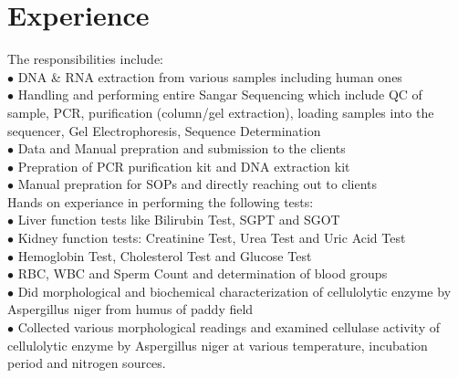 \documentclass[letterpaper]{twentysecondcv} %
\begin{document}

\section{Experience}

\begin{twenty} %
	{The responsibilities include:\\
	$\bullet$ DNA \& RNA extraction from various samples including human ones\\
	$\bullet$ Handling and performing entire Sangar Sequencing which include  QC of sample, PCR, purification (column/gel extraction), loading samples into the sequencer, Gel Electrophoresis, Sequence Determination\\
	$\bullet$ Data and Manual prepration and submission to the clients\\
	$\bullet$ Prepration of PCR purification kit and DNA extraction kit\\
	$\bullet$ Manual prepration for SOPs and directly reaching out to clients\\
	}
	{Hands on experiance in performing the following tests:\\
	$\bullet$ Liver function tests like Bilirubin Test, SGPT and SGOT\\
	$\bullet$ Kidney function tests: Creatinine Test, Urea Test and Uric Acid Test\\
	$\bullet$ Hemoglobin Test, Cholesterol Test and  Glucose  Test\\
	$\bullet$ RBC, WBC and Sperm Count and determination of blood groups\\
	}
	{$\bullet$ Did morphological and biochemical characterization of cellulolytic enzyme by Aspergillus niger from humus of paddy field\\
	$\bullet$ Collected various morphological readings and examined cellulase activity of cellulolytic enzyme by Aspergillus niger at various temperature, incubation period and nitrogen sources.\\\\
	}

\end{twenty}
\end{document}
